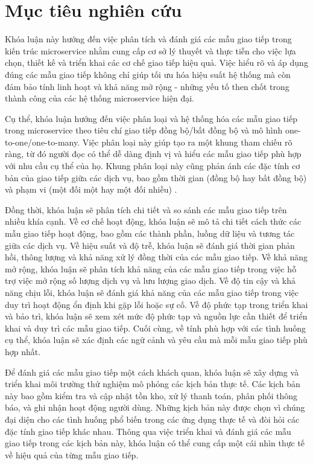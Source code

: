 \section{Mục tiêu nghiên cứu}
Khóa luận này hướng đến việc phân tích và đánh giá các mẫu giao tiếp trong kiến
trúc microservice nhằm cung cấp cơ sở lý thuyết và thực tiễn cho việc lựa chọn,
thiết kế và triển khai các cơ chế giao tiếp hiệu quả. Việc hiểu rõ và áp dụng
đúng các mẫu giao tiếp không chỉ giúp tối ưu hóa hiệu suất hệ thống mà còn đảm
bảo tính linh hoạt và khả năng mở rộng - những yếu tố then chốt trong thành
công của các hệ thống microservice hiện đại.

Cụ thể, khóa luận hướng đến việc phân loại và hệ thống hóa các mẫu giao tiếp
trong microservice theo tiêu chí giao tiếp đồng bộ/bất đồng bộ và mô hình
one-to-one/one-to-many. Việc phân loại này giúp tạo ra một khung tham chiếu rõ
ràng, từ đó người đọc có thể dễ dàng định vị và hiểu các mẫu giao tiếp phù hợp
với nhu cầu cụ thể của họ. Khung phân loại này cũng phản ánh các đặc tính cơ
bản của giao tiếp giữa các dịch vụ, bao gồm thời gian (đồng bộ hay bất đồng
bộ) và phạm vi (một đối một hay một đối nhiều) \cite{richardson2019}.

Đồng thời, khóa luận sẽ phân tích chi tiết và so sánh các mẫu giao tiếp trên nhiều khía cạnh. Về cơ chế hoạt động, khóa luận sẽ mô tả chi tiết cách thức các mẫu giao tiếp hoạt động, bao gồm các thành phần, luồng dữ liệu và tương tác giữa các dịch vụ. Về hiệu suất và độ trễ, khóa luận sẽ đánh giá thời gian phản hồi, thông lượng và khả năng xử lý đồng thời của các mẫu giao tiếp. Về khả năng mở rộng, khóa luận sẽ phân tích khả năng của các mẫu giao tiếp trong việc hỗ trợ việc mở rộng số lượng dịch vụ và lưu lượng giao dịch. Về độ tin cậy và khả năng chịu lỗi, khóa luận sẽ đánh giá khả năng của các mẫu giao tiếp trong việc duy trì hoạt động ổn định khi gặp lỗi hoặc sự cố. Về độ phức tạp trong triển khai và bảo trì, khóa luận sẽ xem xét mức độ phức tạp và nguồn lực cần thiết để triển khai và duy trì các mẫu giao tiếp. Cuối cùng, về tính phù hợp với các tình huống cụ thể, khóa luận sẽ xác định các ngữ cảnh và yêu cầu mà mỗi mẫu giao tiếp phù hợp nhất.

Để đánh giá các mẫu giao tiếp một cách khách quan, khóa luận sẽ xây dựng và triển khai môi trường thử nghiệm mô phỏng các kịch bản thực tế. Các kịch bản này bao gồm kiểm tra và cập nhật tồn kho, xử lý thanh toán, phân phối thông báo, và ghi nhận hoạt động người dùng. Những kịch bản này được chọn vì chúng đại diện cho các tình huống phổ biến trong các ứng dụng thực tế và đòi hỏi các đặc tính giao tiếp khác nhau. Thông qua việc triển khai và đánh giá các mẫu giao tiếp trong các kịch bản này, khóa luận có thể cung cấp một cái nhìn thực tế về hiệu quả của từng mẫu giao tiếp.

